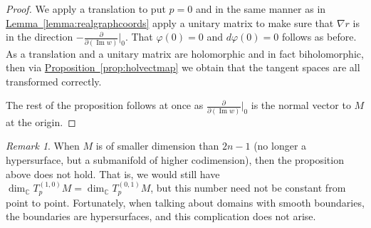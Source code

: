 \documentclass[12pt,openany]{book}
\renewcommand{\Im}{\operatorname{Im}}
\newcommand{\C}{{\mathbb{C}}}
\theoremstyle{plain}
\theoremstyle{remark}
\newtheorem{remark}[thm]{Remark}
\theoremstyle{definition}
\theoremstyle{exercise}
\theoremstyle{example}
\newcommand{\propref}[1]{\hyperref[#1]{Proposition~\ref*{#1}}}
\newcommand{\lemmaref}[1]{\hyperref[#1]{Lemma~\ref*{#1}}}
\begin{document}
\begin{proof}
We apply a translation to put $p=0$ and in the
same manner as in \lemmaref{lemma:realgraphcoords}
apply a unitary matrix to make sure that $\nabla r$ is
in the direction
$-\frac{\partial}{\partial (\Im w)}\big|_0$.  That $\varphi(0) = 0$
and $d\varphi(0) = 0$ follows as before.
As a translation and a unitary matrix are holomorphic
and in fact biholomorphic, then
via \propref{prop:holvectmap} we obtain that the tangent spaces are all
transformed correctly.

The rest of the proposition follows at once as
$\frac{\partial}{\partial (\Im w)}\big|_0$ is the normal vector to $M$
at the origin.
\end{proof}

\begin{remark}
When $M$ is of smaller dimension than $2n-1$ (no longer a hypersurface, but
a submanifold of higher codimension), then the proposition above does not hold.
That is, we would still have $\dim_\C T_p^{(1,0)} M = \dim_\C T_p^{(0,1)}
M$, but this number need not be constant from point to point.  Fortunately,
when talking about domains with smooth boundaries, the boundaries are
hypersurfaces, and this complication does not arise.
\end{remark}
\end{document}
